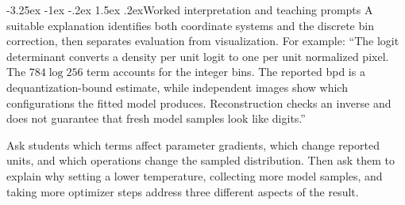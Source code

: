 \documentclass[11pt,a4paper]{article}
\makeatletter
\renewcommand\subsection{\@startsection{subsection}{2}{\z@}%
  {-3.25ex \@plus -1ex \@minus -.2ex}%
  {1.5ex \@plus .2ex}{\normalfont\large}}
\makeatother
\begin{document}
\FloatBarrier
\subsection{Worked interpretation and teaching prompts}
A suitable explanation identifies both coordinate systems and the discrete
bin correction, then separates evaluation from visualization. For example:
``The logit determinant converts a density per unit logit to one per unit
normalized pixel. The $784\log256$ term accounts for the integer bins. The
reported bpd is a dequantization-bound estimate, while independent images
show which configurations the fitted model produces. Reconstruction checks
an inverse and does not guarantee that fresh model samples look like digits.''

Ask students which terms affect parameter gradients, which change reported
units, and which operations change the sampled distribution. Then ask them
to explain why setting a lower temperature, collecting more model samples,
and taking more optimizer steps address three different aspects of the result.
\end{document}
